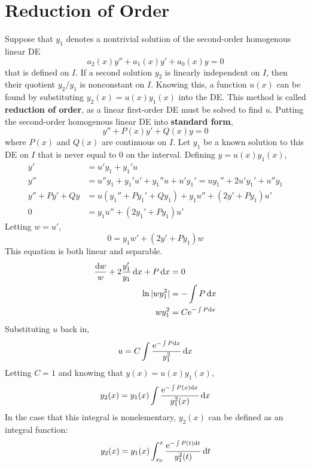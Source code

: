 \documentclass[./Differential Equations]{subfiles}
\begin{document}
	\section{Reduction of Order}
			Suppose that \(y_1\) denotes a nontrivial solution of the second-order homogenous linear DE
				\[a_2(x)y''+ a_1(x)y' + a_0(x)y = 0\]
				that is defined on \(I\). If a second solution \(y_2\) is linearly independent on \(I\), then their quotient \(y_2/y_1\) is nonconstant on \(I\). Knowing this, a function \(u(x)\) can be found by substituting \(y_2(x) = u(x)y_1(x)\) into the DE. This method is called \textbf{reduction of order}, as a linear first-order DE must be solved to find \(u\).
			Putting the second-order homogenous linear DE into \textbf{standard form},
				\[y'' + P(x)y' + Q(x)y = 0\]
				where \(P(x)\) and \(Q(x)\) are continuous on \(I\). Let \(y_1\) be a known solution to this DE on \(I\) that is never equal to 0 on the interval. Defining \(y = u(x)y_1(x)\),
				\begin{align*}
					y' &= u'y_1 + y_1'u \\
					y'' &= u''y_1 + y_1'u' + y_1''u + u'y_1'
							= uy_1'' + 2u'y_1' + u''y_1 \\
					y'' + Py' + Qy &= u(y_1'' + Py_1' + Qy_1) + y_1u'' + (2y' + Py_1)u' \\
						0 &= y_1u'' + (2y_1' + Py_1)u'
				\end{align*}
				Letting \(w = u'\),
				\[0 = y_1w' + (2y' + Py_1)w\]
				This equation is both linear and separable.
				\begin{align*}
					\frac{\dd{w}}{w} + 2\frac{y_1'}{y_1}\dd{x} + P\dd{x} &= 0 \\
					\ln|wy_1^2| &= -\int P \dd{x} \\
					wy_1^2 &= C\text{e}^{-\int P \dd{x}}
				\end{align*}
				Substituting \(u\) back in,
				\[u = C\int \frac{\text{e}^{-\int P \dd{x}}}{y_1^2} \dd{x}\]
				Letting \(C = 1\) and knowing that \(y(x) = u(x)y_1(x)\),
				\[y_2(x) = y_1(x)\int \frac{\text{e}^{-\int P(x) \dd{x}}}{y_1^2(x)} \dd{x}\]
				In the case that this integral is nonelementary, \(y_2(x)\) can be defined as an integral function:
				\[y_2(x) = y_1(x)\int_{x_0}^x \frac{\text{e}^{-\int P(t) \dd{t}}}{y_1^2(t)} \dd{t}\]
\end{document}
